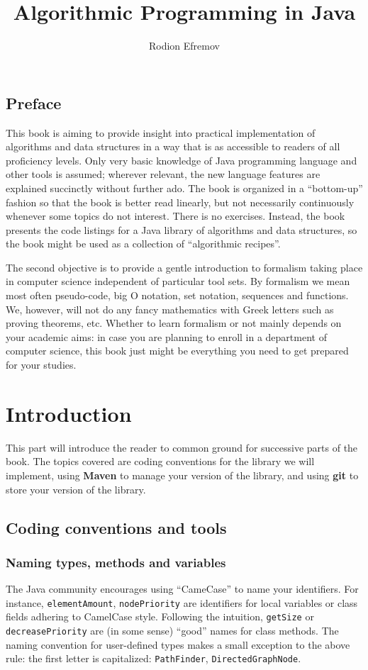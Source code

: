 \documentclass[oneside]{book}
\title{Algorithmic Programming in Java}
\author{Rodion Efremov}
\date{}
\begin{document}
\maketitle
\tableofcontents

\chapter*{Preface}
This book is aiming to provide insight into practical implementation of algorithms and data structures in a way that is as accessible to readers of all proficiency levels. Only very basic knowledge of Java programming language and other tools is assumed; wherever relevant, the new language features are explained succinctly without further ado. The book is organized in a ``bottom-up'' fashion so that the book is better read linearly, but not necessarily continuously whenever some topics do not interest. There is no exercises. Instead, the book presents the code listings for a Java library of algorithms and data structures, so the book might be used as a collection of ``algorithmic recipes''. 

The second objective is to provide a gentle introduction to formalism taking place in computer science independent of particular tool sets. By formalism we mean most often pseudo-code, big O notation, set notation, sequences and functions. We, however, will not do any fancy mathematics with Greek letters such as proving theorems, etc. Whether to learn formalism or not mainly depends on your academic aims: in case you are planning to enroll in a department of computer science, this book just might be everything you need to get prepared for your studies.

\makeatletter\@openrightfalse
\part{Introduction}
This part will introduce the reader to common ground for successive parts of the book. The topics covered are coding conventions for the library we will implement, using \textbf{Maven} to manage your version of the library, and using \textbf{git} to store your version of the library.

\chapter{Coding conventions and tools}
\@openrighttrue\makeatother
\section{Naming types, methods and variables}
The Java community encourages using ``CameCase'' to name your identifiers. For instance, \texttt{elementAmount}, \texttt{nodePriority} are identifiers for local variables or class fields adhering to CamelCase style. Following the intuition, \texttt{getSize} or \texttt{decreasePriority} are (in some sense) ``good'' names for class methods. The naming convention for user-defined types makes a small exception to the above rule: the first letter is capitalized: \texttt{PathFinder}, \texttt{DirectedGraphNode}.
\end{document}
